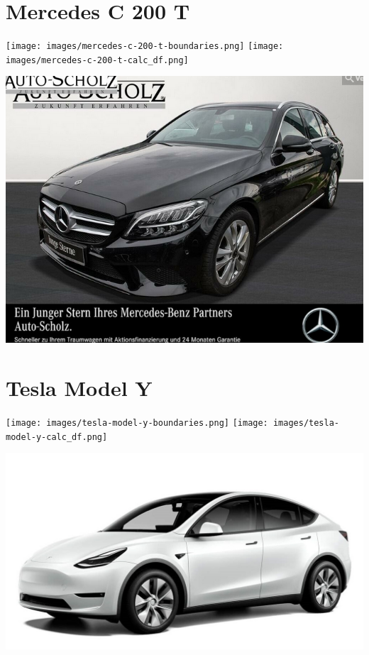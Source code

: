 \documentclass[landscape, DIV=99, 14pt]{scrartcl}
\begin{document}
\pagebreak


\twocolumn

\section*{Mercedes C 200 T}
\begin{center}
\texttt{[image: images/mercedes-c-200-t-boundaries.png]}
\null
\vspace{0.5cm}
\texttt{[image: images/mercedes-c-200-t-calc\_df.png]}
\end{center}

\pagebreak
\null
\vspace{2cm}
\begin{center}
\includegraphics[width=0.9\columnwidth]{cars/mercedes-c-200-t.png}
\end{center}

\pagebreak


\twocolumn

\section*{Tesla Model Y}
\begin{center}
\texttt{[image: images/tesla-model-y-boundaries.png]}
\null
\vspace{0.5cm}
\texttt{[image: images/tesla-model-y-calc\_df.png]}
\end{center}

\pagebreak
\null
\vspace{2cm}
\begin{center}
\includegraphics[width=0.9\columnwidth]{cars/tesla-model-y.jpg}
\end{center}
\end{document}
